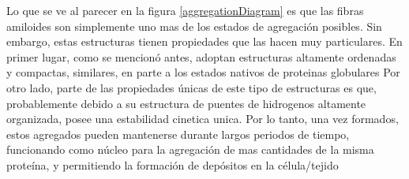 
Lo que se ve al parecer en la figura \ref{aggregationDiagram} es que las fibras amiloides son simplemente uno mas de los estados de agregación posibles.
Sin embargo, estas estructuras tienen propiedades que las hacen muy particulares.
En primer lugar, como se mencionó antes, adoptan estructuras altamente ordenadas y compactas, similares, en parte a los estados nativos de proteinas globulares
Por otro lado, parte de las propiedades únicas de este tipo de estructuras es que, probablemente debido a su estructura de puentes de hidrogenos altamente organizada, posee una estabilidad cinetica unica.
Por lo tanto, una vez formados, estos agregados pueden mantenerse durante largos periodos de tiempo, funcionando como núcleo para la agregación de mas cantidades de la misma proteína, y permitiendo la formación de depósitos en la célula/tejido




